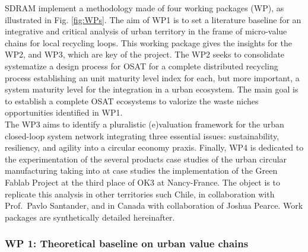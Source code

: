 \documentclass[
  11pt,
  a4paperpaper,
  onecolumn]{article}
\begin{document}
SDRAM implement a methodology made of four working packages (WP), as
illustrated in Fig. \ref{fig:WPs}. The aim of WP1 is to set a literature
baseline for an integrative and critical analysis of urban territory in
the frame of micro-value chains for local recycling loops. This working
package gives the insights for the WP2, and WP3, which are key of the
project. The WP2 seeks to consolidate systematize a design process for
OSAT for a complete distributed recycling process establishing an unit
maturity level index for each, but more important, a system maturity
level for the integration in a urban ecosystem. The main goal is to
establish a complete OSAT ecosystems to valorize the waste niches
opportunities identified in WP1.\\
The WP3 aims to identify a pluralistic (e)valuation framework for the
urban closed-loop system network integrating three essential issues:
sustainability, resiliency, and agility into a circular economy praxis.
Finally, WP4 is dedicated to the experimentation of the several products
case studies of the urban circular manufacturing taking into at case
studies the implementation of the Green Fablab Project at the third
place of OK3 at Nancy-France. The object is to replicate this analysis
in other territories such Chile, in collaboration with Prof.~Pavlo
Santander, and in Canada with collaboration of Joshua Pearce. Work
packages are synthetically detailed hereinafter.

\hypertarget{wp-1-theoretical-baseline-on-urban-value-chains}{%
\subsubsection{WP 1: Theoretical baseline on urban value
chains}\label{wp-1-theoretical-baseline-on-urban-value-chains}}
\end{document}
